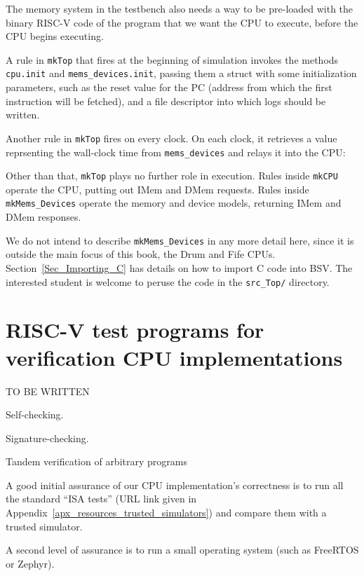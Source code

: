 The memory system in the testbench also needs a way to be pre-loaded
with the binary RISC-V code of the program that we want the CPU to
execute, before the CPU begins executing.

A rule in \verb|mkTop| that fires at the beginning of simulation
invokes the methods \verb|cpu.init| and \verb|mems_devices.init|,
passing them a struct with some initialization parameters, such as the
reset value for the PC (address from which the first instruction will
be fetched), and a file descriptor into which logs should be written.



Another rule in \verb|mkTop| fires on every clock.  On each clock, it
retrieves a value reprsenting the wall-clock time from
\verb|mems_devices| and relays it into the CPU:



Other than that, \verb|mkTop| plays no further role in execution.
Rules inside \verb|mkCPU| operate the CPU, putting out IMem and DMem
requests.  Rules inside \verb|mkMems_Devices| operate the memory and
device models, returning IMem and DMem responses.

We do not intend to describe \verb|mkMems_Devices| in any more detail
here, since it is outside the main focus of this book, the Drum and
Fife CPUs.  Section~\ref{Sec_Importing_C} has details on how to import
C code into BSV.  The interested student is welcome to peruse the code
in the \verb|src_Top/| directory.


\section{RISC-V test programs for verification CPU implementations}

TO BE WRITTEN

Self-checking.

Signature-checking.

Tandem verification of arbitrary programs

A good initial assurance of our CPU implementation's correctness is to
run all the standard ``ISA tests'' (URL link given in
Appendix~\ref{apx_resources_trusted_simulators}) and compare them with
a trusted simulator.

A second level of assurance is to run a small operating system (such
as FreeRTOS or Zephyr).

